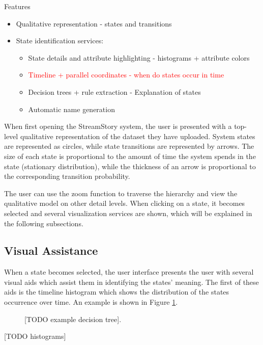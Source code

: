 Features  
\begin{itemize}
	\item Qualitative representation - states and transitions
	\item State identification services:
	\begin{itemize}
		\item State details and attribute highlighting - histograms + attribute colors
		\item \textcolor{red}{Timeline + parallel coordinates \cite{parcoords} - when do states occur in time}
		\item Decision trees + rule extraction - Explanation of states
		\item Automatic name generation
	\end{itemize}
\end{itemize}

When first opening the StreamStory system, the user is presented with a top-level qualitative representation
of the dataset they have uploaded. System states are represented as circles, while state transitions are
represented by arrows. The size of each state is proportional to the amount of time the system spends in
the state (stationary distribution), while the thickness of an arrow is proportional to the corresponding
transition probability.

The user can use the zoom function to traverse the hierarchy and view the qualitative model on other 
detail levels. When clicking on a state, it becomes selected and several visualization services are
shown, which will be explained in the following subsections.

\subsection{Visual Assistance}

When a state becomes selected, the user interface presents the user with several visual aids which
assist them in identifying the states' meaning. The first of these aids is the timeline histogram
which shows the distribution of the states occurrence over time. An example is shown in Figure 
\ref{fig:time-hist}.

\begin{figure}[h!]
	\centering
	\caption{[TODO example decision tree].}
	\label{fig:time-hist}
\end{figure}

[TODO histograms]

